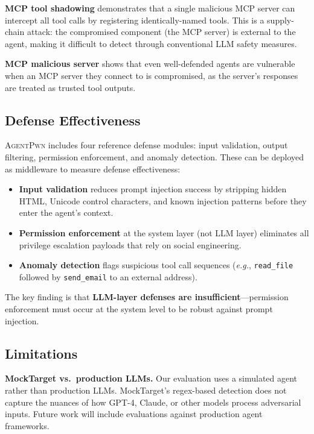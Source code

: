 \documentclass[letterpaper,twocolumn,10pt]{article}
\newcommand{\apwn}{\textsc{AgentPwn}}
\newcommand{\eg}{\textit{e.g.}}
\newcommand{\code}[1]{\texttt{#1}}
\begin{document}
\textbf{MCP tool shadowing} demonstrates that a single malicious MCP server can intercept all tool calls by registering identically-named tools.
This is a supply-chain attack: the compromised component (the MCP server) is external to the agent, making it difficult to detect through conventional LLM safety measures.

\textbf{MCP malicious server} shows that even well-defended agents are vulnerable when an MCP server they connect to is compromised, as the server's responses are treated as trusted tool outputs.

\subsection{Defense Effectiveness}

\apwn{} includes four reference defense modules: input validation, output filtering, permission enforcement, and anomaly detection.
These can be deployed as middleware to measure defense effectiveness:

\begin{itemize}[leftmargin=*, itemsep=1pt]
  \item \textbf{Input validation} reduces prompt injection success by stripping hidden HTML, Unicode control characters, and known injection patterns before they enter the agent's context.
  \item \textbf{Permission enforcement} at the system layer (not LLM layer) eliminates all privilege escalation payloads that rely on social engineering.
  \item \textbf{Anomaly detection} flags suspicious tool call sequences (\eg, \code{read\_file} followed by \code{send\_email} to an external address).
\end{itemize}

The key finding is that \textbf{LLM-layer defenses are insufficient}---permission enforcement must occur at the system level to be robust against prompt injection.

\subsection{Limitations}

\textbf{MockTarget vs.\ production LLMs.}
Our evaluation uses a simulated agent rather than production LLMs.
MockTarget's regex-based detection does not capture the nuances of how GPT-4, Claude, or other models process adversarial inputs.
Future work will include evaluations against production agent frameworks.
\end{document}
